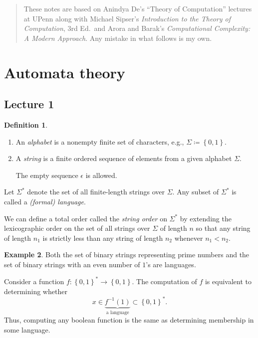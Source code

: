 \documentclass[10pt,letterpaper,cm]{nupset}
\theoremstyle{definition}
\newtheorem{definition}{Definition}[subsection]
\newtheorem{exmp}[definition]{Example}
\theoremstyle{theorem}
\theoremstyle{remark}
\newcommand{\1}{\mathbf{1}}
\newcommand{\0}{\vec 0}
\begin{document}
\thispagestyle{empty}
\begin{abstract}
These notes are based on Anindya De's ``Theory of Computation'' lectures at UPenn along with Michael Sipser's \textit{Introduction to the Theory of Computation}, 3rd Ed.\ and Arora and Barak's \textit{Computational Complexity: A Modern Approach}. Any mistake in what follows is my own.
\end{abstract}

\tableofcontents
\newpage

\section{Automata theory}

\subsection{Lecture 1}

\begin{definition} $ $
\begin{enumerate}
\item An \textit{alphabet} is a nonempty finite set of characters, e.g., $\Sigma \coloneqq \left\{0,1\right\}$. 
\item A \textit{string} is a finite ordered sequence of elements from a given alphabet $\Sigma$. 

The empty sequence $\epsilon$ is allowed.
\end{enumerate}
\end{definition}

Let $\Sigma^{\ast}$ denote the set of all finite-length strings over $\Sigma$. Any subset of $\Sigma^{\ast}$ is called a \textit{(formal) language}.

\medskip

We can define a total order called the \textit{string order} on $\Sigma^{\ast}$ by extending the  lexicographic order on the set of all strings over $\Sigma$ of length $n$ so that any string of length $n_1$ is strictly less than any string of length $n_2$ whenever $n_1<n_2$.

\begin{exmp}
Both the set of binary strings representing prime numbers and the set of binary strings with an even number of $1$'s are languages. 
\end{exmp}

\smallskip

Consider a function $f: \left\{0,1\right\}^{\ast} \to \left\{0,1\right\}$. The computation of $f$ is equivalent to determining whether $$x\in \underbrace{f^{-1}(1)}_{\text{a language}} \subset \left\{0,1\right\}^{\ast}.$$ Thus, computing any boolean function is the same as determining membership in some language.
\end{document}
